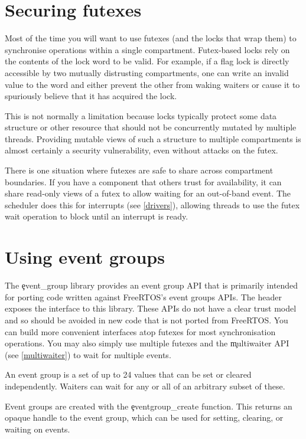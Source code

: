 \section{Securing futexes}

Most of the time you will want to use futexes (and the locks that wrap them) to synchronise operations within a single compartment.
Futex-based locks rely on the contents of the lock word to be valid.
For example, if a flag lock is directly accessible by two mutually distrusting compartments, one can write an invalid value to the word and either prevent the other from waking waiters or cause it to spuriously believe that it has acquired the lock.

This is not normally a limitation because locks typically protect some data structure or other resource that should not be concurrently mutated by multiple threads.
Providing mutable views of such a structure to multiple compartments is almost certainly a security vulnerability, even without attacks on the futex.

There is one situation where futexes are safe to share across compartment boundaries.
If you have a component that others trust for availability, it can share read-only views of a futex to allow waiting for an out-of-band event.
The scheduler does this for interrupts (see \ref{drivers}), allowing threads to use the futex wait operation to block until an interrupt is ready.

\section{Using event groups}

The \c{event_group} library provides an event group API that is primarily intended for porting code written against FreeRTOS's event groups APIs.
The  header exposes the interface to this library.
These APIs do not have a clear trust model and so should be avoided in new code that is not ported from FreeRTOS.
You can build more convenient interfaces atop futexes for most synchronisation operations.
You may also simply use multiple futexes and the \c{multiwaiter} API (see \ref{multiwaiter}) to wait for multiple events.

An event group is a set of up to 24 values that can be set or cleared independently.
Waiters can wait for any or all of an arbitrary subset of these.

Event groups are created with the \c{eventgroup_create} function.
This returns an opaque handle to the event group, which can be used for setting, clearing, or waiting on events.

